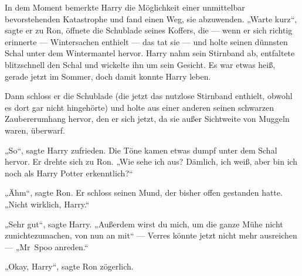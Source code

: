 In dem Moment bemerkte Harry die Möglichkeit einer unmittelbar bevorstehenden Katastrophe und fand einen Weg, sie abzuwenden.
„Warte kurz“, sagte er zu Ron, öffnete die Schublade seines Koffers, die — wenn er sich richtig erinnerte — Wintersachen enthielt — das tat sie — und holte seinen dünnsten Schal unter dem Wintermantel hervor. Harry nahm sein Stirnband ab, entfaltete blitzschnell den Schal und wickelte ihn um sein Gesicht. Es war etwas heiß, gerade jetzt im Sommer, doch damit konnte Harry leben.

Dann schloss er die Schublade (die jetzt das nutzlose Stirnband enthielt, obwohl es dort gar nicht hingehörte) und holte aus einer anderen seinen schwarzen Zaubererumhang hervor, den er sich jetzt, da sie außer Sichtweite von Muggeln waren, überwarf.

„So“, sagte Harry zufrieden. Die Töne kamen etwas dumpf unter dem Schal hervor. Er drehte sich zu Ron.
„Wie sehe ich aus? Dämlich, ich weiß, aber bin ich noch als Harry Potter erkenntlich?“

„Ähm“, sagte Ron. Er schloss seinen Mund, der bisher offen gestanden hatte.
„Nicht wirklich, Harry.“

„Sehr gut“, sagte Harry.
„Außerdem wirst du mich, um die ganze Mühe nicht zunichtezumachen, von nun an mit“ — Verres könnte jetzt nicht mehr ausreichen —
„Mr~Spoo anreden.“

„Okay, Harry“, sagte Ron zögerlich.

